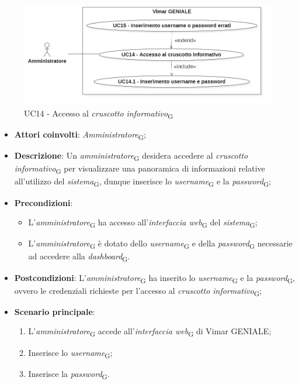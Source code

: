 \begin{figure}[H]
\centering
\includegraphics[width=1\textwidth]{contents/casi_duso/png/UC14.png}
\caption{UC14 - Accesso al \textit{cruscotto informativo}\textsubscript{G}}
\end{figure}

\begin{itemize}
    \item \textbf{Attori coinvolti}: \textit{Amministratore}\textsubscript{G};
    \item \textbf{Descrizione}: Un \textit{amministratore}\textsubscript{G} desidera accedere al \textit{cruscotto informativo}\textsubscript{G} per visualizzare una panoramica di informazioni relative all’utilizzo del \textit{sistema}\textsubscript{G}, dunque inserisce lo \textit{username}\textsubscript{G} e la \textit{password}\textsubscript{G};
    \item \textbf{Precondizioni}: 
    \begin{itemize}
        \item L’\textit{amministratore}\textsubscript{G} ha accesso all’\textit{interfaccia web}\textsubscript{G} del \textit{sistema}\textsubscript{G};
        \item L’\textit{amministratore}\textsubscript{G} è dotato dello \textit{username}\textsubscript{G} e della \textit{password}\textsubscript{G} necessarie ad accedere alla \textit{dashboard}\textsubscript{G}.
    \end{itemize}
    \item \textbf{Postcondizioni}: L’\textit{amministratore}\textsubscript{G} ha inserito lo \textit{username}\textsubscript{G} e la \textit{password}\textsubscript{G}, ovvero le credenziali richieste per l’accesso al \textit{cruscotto informativo}\textsubscript{G};
    \item \textbf{Scenario principale}:
    \begin{enumerate}
        \item L’\textit{amministratore}\textsubscript{G} accede all’\textit{interfaccia web}\textsubscript{G} di Vimar GENIALE;
        \item Inserisce lo \textit{username}\textsubscript{G};
        \item Inserisce la \textit{password}\textsubscript{G}.
    \end{enumerate}
\end{itemize}

